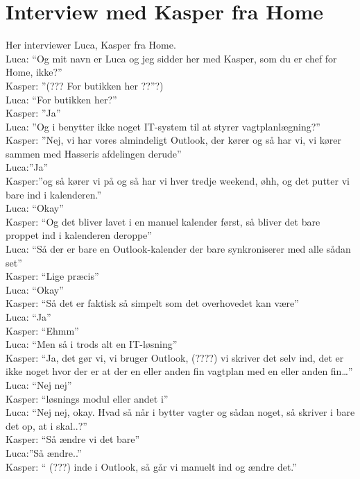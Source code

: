 \section{Interview med Kasper fra Home}\label{app:home}
Her interviewer Luca, Kasper fra Home.\\
Luca: “Og mit navn er Luca og jeg sidder her med Kasper, som du er chef for Home, ikke?”\\
Kasper: ”(??? For butikken her ??”?)\\
Luca: “For butikken her?”\\
Kasper: ”Ja”\\
Luca: ”Og i benytter ikke noget IT-system til at styrer vagtplanlægning?”\\
Kasper: ”Nej, vi har vores almindeligt Outlook, der kører og så har vi, vi kører sammen med Hasseris afdelingen derude”\\
Luca:”Ja”\\
Kasper:”og så kører vi på og så har vi hver tredje weekend, øhh, og det putter vi bare ind i kalenderen.”\\
Luca: “Okay”\\
Kasper: “Og det bliver lavet i en manuel kalender først, så bliver det bare proppet ind i kalenderen deroppe”\\
Luca: “Så der er bare en Outlook-kalender der bare synkroniserer med alle sådan set”\\
Kasper: “Lige præcis”\\
Luca: “Okay”\\
Kasper: “Så det er faktisk så simpelt som det overhovedet kan være”\\
Luca: “Ja”\\
Kasper: “Ehmm”\\
Luca: “Men så i trods alt en IT-løsning”\\
Kasper: “Ja, det gør vi, vi bruger Outlook, (????) vi skriver det selv ind, det er ikke noget hvor der er at der en eller anden fin vagtplan med en eller anden fin…”\\
Luca: “Nej nej”\\
Kasper: “løsnings modul eller andet i”\\
Luca: “Nej nej, okay. Hvad så når i bytter vagter og sådan noget, så skriver i bare det op, at i skal..?”\\
Kasper: “Så ændre vi det bare”\\
Luca:”Så ændre..”\\
Kasper: “ (???) inde i Outlook, så går vi manuelt ind og ændre det.”\\
